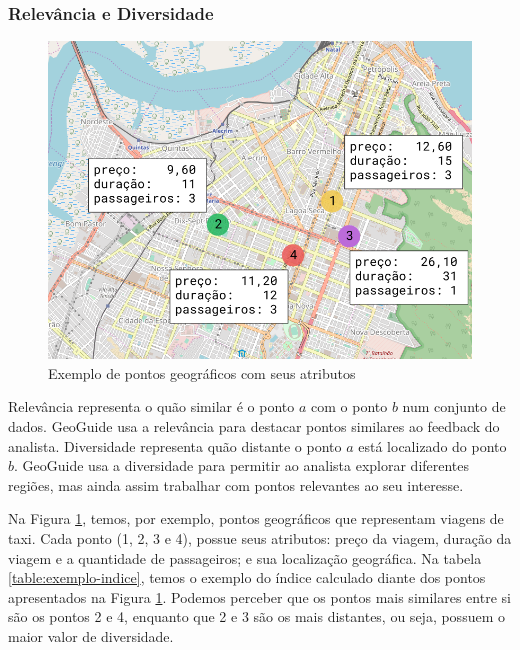 \subsubsection{Relevância e Diversidade}

\begin{figure}[t]
	\centering
	\includegraphics[width=\columnwidth]{imagens/exemplo-de-pontos}
	\caption{Exemplo de pontos geográficos com seus atributos}
	\label{fig:exemplo-pontos}
	\vspace{-10pt}
\end{figure}

Relevância representa o quão similar é o ponto $a$ com o ponto $b$ num conjunto de dados. GeoGuide usa a relevância para destacar pontos similares ao feedback do analista. Diversidade representa quão distante o ponto $a$ está localizado do ponto $b$. GeoGuide usa a diversidade para permitir ao analista explorar diferentes regiões, mas ainda assim trabalhar com pontos relevantes ao seu interesse.

Na Figura \ref{fig:exemplo-pontos}, temos, por exemplo, pontos geográficos que representam viagens de taxi. Cada ponto (1, 2, 3 e 4), possue seus atributos: preço da viagem, duração da viagem e a quantidade de passageiros; e sua localização geográfica. Na tabela \ref{table:exemplo-indice}, temos o exemplo do índice calculado diante dos pontos apresentados na Figura \ref{fig:exemplo-pontos}. Podemos perceber que os pontos mais similares entre si são os pontos 2 e 4, enquanto que 2 e 3 são os mais distantes, ou seja, possuem o maior valor de diversidade.

